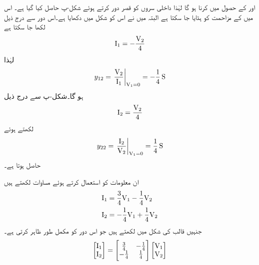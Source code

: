  اور  کے حصول میں  کرنا ہو گا لہٰذا داخلی سروں کو قصر دور کرتے ہوئے شکل-پ حاصل کیا گیا ہے۔ اس میں  کے مزاحمت کو ہٹایا جا سکتا ہے البتہ میں نے اس کو شکل میں دکھایا ہے۔اس دور سے درج ذیل لکھا جا سکتا ہے
\begin{align*}
{\ensuremath{{\textup{I}}}}_1=-\frac{{{\textup{V}}}_2}{4}
\end{align*} 
لہٰذا
\begin{align*}
y_{12}=\left.\frac{\bV_2}{\bI_1} \right|_{\bV_1=0}=-\frac{1}{4}\,\si{\siemens}
\end{align*}
ہو گا۔شکل-پ سے درج ذیل
\begin{align*}
{\ensuremath{{\textup{I}}}}_2=\frac{{{\textup{V}}}_2}{4}
\end{align*}
 لکھتے ہوئے
\begin{align*}
y_{22}=\left.\frac{\bI_2}{\bV_2} \right|_{\bV_1=0}=\frac{1}{4} \, \si{\siemens}
\end{align*}
حاصل ہوتا ہے۔

ان معلومات کو استعمال کرتے ہوئے مساوات  لکھتے ہیں
\begin{gather}
\begin{aligned}\label{مساوات_نمونہ_مثال_الف}
{\ensuremath{{\textup{I}}}}_1&=\frac{3}{4}{{\textup{V}}}_1-\frac{1}{4}{{\textup{V}}}_2\\
{{\textup{I}}}_2&=-\frac{1}{4}{{\textup{V}}}_1+\frac{1}{4}{{\textup{V}}}_2
\end{aligned}
\end{gather}
جنہیں قالب کی شکل میں لکھتے ہیں جو اس دور کو مکمل طور ظاہر کرتی ہے۔
\begin{align*}
\begin{bmatrix}
{\ensuremath{{\textup{I}}}}_1\\
{{\textup{I}}}_2
\end{bmatrix}
=
\begin{bmatrix}
\frac{3}{4} & -\frac{1}{4}\\
-\frac{1}{4} & \frac{1}{4}
\end{bmatrix}
\begin{bmatrix}
{\ensuremath{{\textup{V}}}}_1\\
{{\textup{V}}}_2
\end{bmatrix}
\end{align*}

